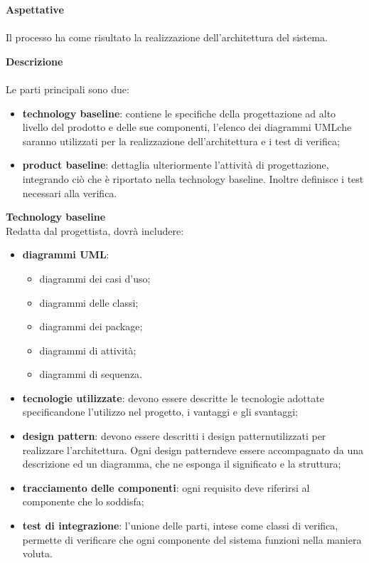 			
			\noindent\textbf{Aspettative} \mbox{}\\ \mbox{}\\
			\noindent Il processo ha come risultato la realizzazione dell'architettura del sistema. 
			\newline
			
			\noindent\textbf{Descrizione}  \mbox{}\\ \mbox{}\\
			\noindent Le parti principali sono due:
				\begin{itemize}
					\item \textbf{technology baseline}: contiene le specifiche della 
						progettazione ad alto livello del prodotto e delle sue componenti, l'elenco dei 
						diagrammi UML\glosp che saranno utilizzati per la realizzazione 
						dell'architettura e i test di verifica;
					\item \textbf{product baseline}: dettaglia ulteriormente l'attività di 
						progettazione, integrando ciò che è riportato nella technology baseline. Inoltre 
						definisce i test necessari alla verifica. \newline
				\end{itemize}
			
			
			\noindent\textbf{Technology baseline} \mbox{}\\
				
			\noindent Redatta dal progettista, dovrà includere:
				\begin{itemize}
					\item \textbf{diagrammi UML\glo}:
					\begin{itemize}
						\item diagrammi dei casi d'uso;
						\item diagrammi delle classi;
						\item diagrammi dei package;
						\item diagrammi di attività;
						\item diagrammi di sequenza.
					\end{itemize}
					\item \textbf{tecnologie utilizzate}: devono essere descritte le tecnologie 
						adottate specificandone l'utilizzo nel progetto, i vantaggi e gli svantaggi;
					\item \textbf{design pattern\glo}: devono essere descritti i design 
						pattern\glosp utilizzati per realizzare l'architettura. Ogni design 
						pattern\glosp deve essere accompagnato da una descrizione ed un diagramma, che 
						ne esponga il significato e la struttura;
					\item \textbf{tracciamento delle componenti}: ogni requisito deve riferirsi 
						al componente che lo soddisfa;
					\item \textbf{test di integrazione}: l'unione delle parti, intese come 
						classi di verifica, permette di verificare che ogni componente del sistema 
						funzioni nella maniera voluta. \newline
				\end{itemize}
						
